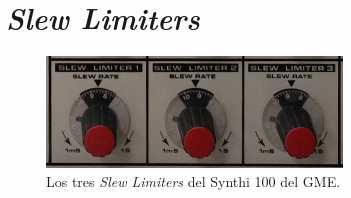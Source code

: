 \section[Slew Limiters]{\textit{Slew Limiters}}
\label{sec:slew_limiters}


\begin{figure}
	\centering
	\includegraphics[width=0.7\textwidth]{images/slew_limiters}
	\caption[\textit{Slew Limiters}]{Los tres \textit{Slew Limiters} del Synthi 100 del GME.}
	\label{fig:slew_limiters}
\end{figure}